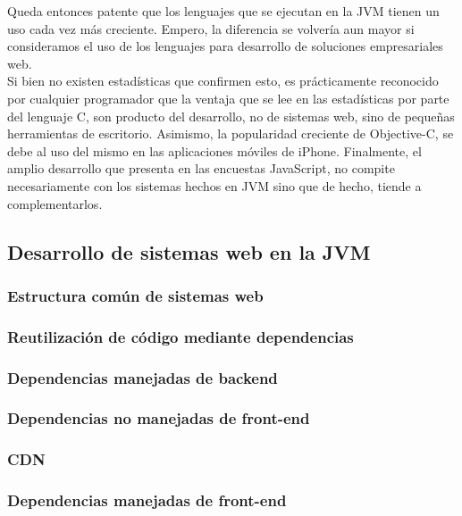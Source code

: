 Queda entonces patente que los lenguajes que se ejecutan en la JVM tienen un uso cada vez
más creciente. Empero, la diferencia se volvería aun mayor si consideramos el uso de los
lenguajes para desarrollo de soluciones empresariales web.\\
Si bien no existen estadísticas que confirmen esto, es prácticamente reconocido por
cualquier programador que la ventaja que se lee en las estadísticas por parte del lenguaje
C, son producto del desarrollo, no de sistemas web, sino de pequeñas herramientas de
escritorio. Asimismo, la popularidad creciente de Objective-C, se debe al uso del mismo en
las aplicaciones móviles de iPhone. Finalmente, el amplio desarrollo que presenta en las
encuestas JavaScript, no compite necesariamente con los sistemas hechos en JVM sino que de
hecho, tiende a complementarlos.\\

\subsection{Desarrollo de sistemas web en la JVM}
\subsubsection{Estructura común de sistemas web}
\subsubsection{Reutilización de código mediante dependencias}
\subsubsection{Dependencias manejadas de backend}
\subsubsection{Dependencias no manejadas de front-end}
\subsubsection{CDN}
\subsubsection{Dependencias manejadas de front-end}